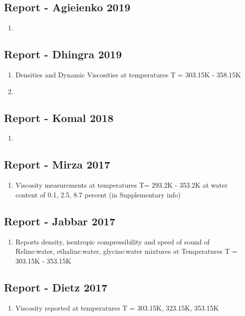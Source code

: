 \documentclass[11pt]{article}
\begin{document}
\subsection{Report - Agieienko 2019 \cite{Agieienko2019}}
\begin{enumerate}
\item
\end{enumerate}
\subsection{Report - Dhingra 2019 \cite{Dhingra2019}}
\begin{enumerate}
\item Densities and Dynamic Viscosities at temperatures T = 303.15K - 358.15K
\item 
\end{enumerate}
\subsection{Report - Komal 2018 \cite{Komal2018}}
\begin{enumerate}
\item
\end{enumerate}
\subsection{Report - Mirza 2017 \cite{Mirza2017}}
\begin{enumerate}
\item Viscosity measurements at temperatures T= 293.2K - 353.2K at water content of 0.1, 2.5, 8.7 percent (in Supplementary info)
\end{enumerate}
\subsection{Report - Jabbar 2017 \cite{Jabbar2017}}
\begin{enumerate}
\item Reports density, isentropic compressibility and speed of sound of Reline:water,  ethaline:water, glycine:water mixtures at Temperatures T = 303.15K - 353.15K
\end{enumerate}
\subsection{Report - Dietz 2017 \cite{Dietz2017}}
\begin{enumerate}
\item Viscosity reported at temperatures T = 303.15K, 323.15K, 353.15K
\end{enumerate}
\end{document}
